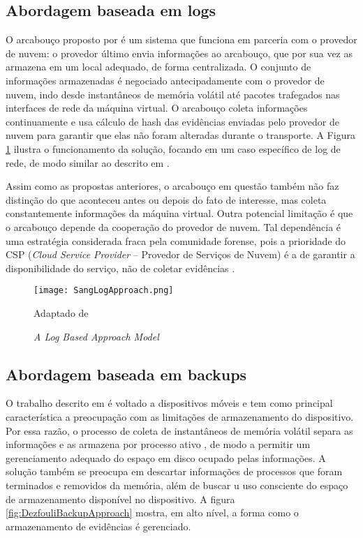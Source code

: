 \subsection{Abordagem baseada em logs}
\label{sec:modelologs}

O arcabouço proposto por \cite{SangLogApproach:2013} é um sistema que funciona em parceria com o provedor de nuvem: o provedor último envia informações ao arcabouço, que por sua vez as armazena em um local adequado, de forma centralizada.
%
O conjunto de informações armazenadas é negociado antecipadamente com o provedor de nuvem, indo desde instantâneos de memória volátil até pacotes trafegados nas interfaces de rede da máquina virtual.
%
O arcabouço coleta informações continuamente e usa cálculo de hash das evidências enviadas pelo provedor de nuvem para garantir que elas não foram alteradas durante o transporte.
%
A Figura \ref{fig:SangLogApproach} ilustra o funcionamento da solução, focando em um caso específico de log de rede, de modo similar ao descrito em \cite{SangLogApproach:2013}.


Assim como as propostas anteriores, o arcabouço em questão também não faz distinção do que aconteceu antes ou depois do fato de interesse, mas  coleta constantemente informações da máquina virtual.
%
Outra potencial limitação é que o arcabouço depende da cooperação do provedor de nuvem. 
%
Tal dependência é uma estratégia considerada fraca pela comunidade forense, pois a prioridade do CSP (\textit{Cloud Service Provider} -- Provedor de Serviços de Nuvem) é a de garantir a disponibilidade do serviço, não de coletar evidências \cite{ClarkeReviewOfChallenges2015}.
%

\begin{figure}[htb!]
\footnotesize
\caption{\textit{A Log Based Approach Model}}
\texttt{[image: SangLogApproach.png]}
\centering
\label{fig:SangLogApproach}
\begin{center}
Adaptado de \cite{SangLogApproach:2013} 
\end{center}
\end{figure}


\subsection{Abordagem baseada em backups}
\label{sec:modelobackup}

O trabalho descrito em \cite{DezfouliBackupApproach:2012} é voltado a dispositivos móveis e tem como principal característica a preocupação com as limitações de armazenamento do dispositivo.
%
Por essa razão, o processo de coleta de instantâneos de memória volátil separa as informações e as armazena por processo ativo , de modo a permitir um gerenciamento adequado do espaço em disco ocupado pelas informações. 
%
A solução também se preocupa em descartar informações de processos que foram terminados e removidos da memória, além de buscar u uso consciente do espaço de armazenamento disponível no dispositivo.
%
A figura \ref{fig:DezfouliBackupApproach} mostra, em alto nível, a forma como o armazenamento de evidências é gerenciado.

